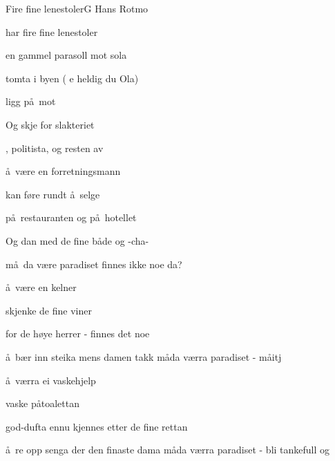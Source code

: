 \begin{SBSong}{Fire fine lenestoler}{G}
  {}{Hans Rotmo}
  \begin{SBChorus}
     har fire fine lenestoler

     en gammel parasoll mot sola

     tomta i byen ( e heldig du Ola)

      ligg p\aa\ mot 

    Og skje for slakteriet

    , politista, og resten av 
  \end{SBChorus}
  \begin{SBVerse}
     \aa\ v\ae re en forretningsmann

     kan f\o re rundt \aa\ selge

     p\aa\ restauranten og  p\aa\ hotellet

    Og dan med de fine 
    b\aa de  og -cha-

     m\aa\ da v\ae re paradiset  finnes ikke noe  da?
  \end{SBVerse}
  \begin{SBVerse}
     \aa\ v\ae re en kelner

     skjenke de fine viner

     for de h\o ye herrer - finnes det noe 

     \aa\ b\ae r inn steika mens damen  takk
     m\aa da v\ae rra paradiset -   m\aa itj 

  \end{SBVerse}
  \begin{SBVerse}
     \aa\ v\ae rra ei vaskehjelp

     vaske p\aa toalettan

     god-dufta ennu kjennes etter de fine rettan

     \aa\ re opp senga der den finaste dama 
     m\aa da v\ae rra paradiset -  bli tankefull og 


\end{SBVerse}
\end{SBSong}
